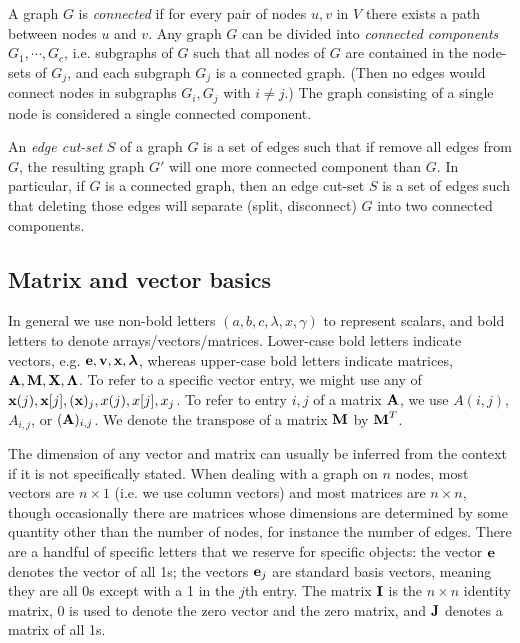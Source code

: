 A graph $G$ is \emph{connected} if for every pair of nodes $u,v$ in $V$ there exists a path between nodes $u$ and $v$. Any graph $G$ can be divided into \emph{connected components} $G_1, \cdots, G_c$, i.e. subgraphs of $G$ such that all nodes of $G$ are contained in the node-sets of $G_j$, and each subgraph $G_j$ is a connected graph. (Then no edges would connect nodes in subgraphs $G_i, G_j$ with $ i \neq j$.) The graph consisting of a single node is considered a single connected component.

An \emph{edge cut-set} $S$ of a graph $G$ is a set of edges such that if remove all edges from $G$, the resulting graph $G'$ will one more connected component than $G$. In particular, if $G$ is a connected graph, then an edge cut-set $S$ is a set of edges such that deleting those edges will separate (split, disconnect) $G$ into two connected components.

\subsection{Matrix and vector basics}\label{sec:notation:matrix}

In general we use non-bold letters $(a,b,c,\lambda, x, \gamma)$ to represent scalars, and bold letters to denote arrays/vectors/matrices. Lower-case bold letters indicate vectors, e.g.
$\textbf{e},\textbf{v},\textbf{x}, \boldsymbol{\lambda}$,
whereas upper-case bold letters indicate matrices, $\textbf{A}, \textbf{M}, \textbf{X}, \boldsymbol{\Lambda}$. To refer to a specific vector entry, we might use any of $\textbf{x}(j), \textbf{x}[j], (\textbf{x})_j, x(j), x[j], x_j$. To refer to entry $i,j$ of a matrix $\textbf{A}$, we use $A(i,j)$, $A_{i,j}$, or $(\textbf{A})_{i,j}$. We denote the transpose of a matrix $\textbf{M}$ by $\textbf{M}^T$.

The dimension of any vector and matrix can usually be inferred from the context if it is not specifically stated. When dealing with a graph on $n$ nodes, most vectors are $n \times 1$ (i.e. we use column vectors) and most matrices are $n \times n$, though occasionally there are matrices whose dimensions are determined by some quantity other than the number of nodes, for instance the number of edges.
There are a handful of specific letters that we reserve for specific objects: the vector $\textbf{e}$ denotes the vector of all 1s; the vectors $\textbf{e}_j$ are standard basis vectors, meaning they are all 0s except with a 1 in the $j$th entry. The matrix $\textbf{I}$ is the $n\times n$ identity matrix, $0$ is used to denote the zero vector and the zero matrix, and $\textbf{J}$ denotes a matrix of all 1s.


